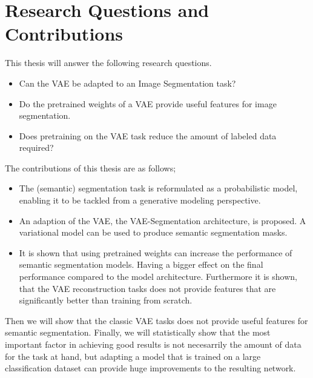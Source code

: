 \section{Research Questions and Contributions}
This thesis will answer the following research questions.
\begin{itemize}
    \item Can the VAE be adapted to an Image Segmentation task?
    \item Do the pretrained weights of a VAE provide useful features for image segmentation.
    \item Does pretraining on the VAE task reduce the amount of labeled data required?
\end{itemize}
The contributions of this thesis are as follows;
\begin{itemize}
    \item The (semantic) segmentation task is reformulated as a probabilistic model, enabling it to be tackled from a generative modeling perspective.
    \item An adaption of the VAE, the VAE-Segmentation architecture, is proposed. A variational model can be used to produce semantic segmentation masks.
    \item It is shown that using pretrained weights can increase the performance of semantic segmentation models. Having a bigger effect on the final performance compared to the model architecture. Furthermore it is shown, that the VAE reconstruction tasks does not provide features that are significantly better than training from scratch.
\end{itemize}
Then we will show that the classic VAE tasks does not provide useful features for semantic segmentation. Finally, we will statistically show that the most important factor in achieving good results is not necesarrily the amount of data for the task at hand, but adapting a model that is trained on a large classification dataset can provide huge improvements to the resulting network.
